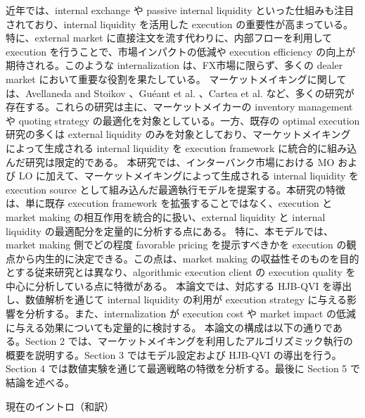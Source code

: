 近年では、internal exchange や passive internal liquidity といった仕組みも注目されており、internal liquidity を活用した execution の重要性が高まっている。特に、external market に直接注文を流す代わりに、内部フローを利用して execution を行うことで、市場インパクトの低減や execution efficiency の向上が期待される。このような internalization は、FX市場に限らず、多くの dealer market において重要な役割を果たしている。
マーケットメイキングに関しては、Avellaneda and Stoikov \cite{avellaneda2008high}、Guéant et al. \cite{gueant2013dealing}、Cartea et al. \cite{cartea2017algorithmic} など、多くの研究が存在する。これらの研究は主に、マーケットメイカーの inventory management や quoting strategy の最適化を対象としている。一方、既存の optimal execution 研究の多くは external liquidity のみを対象としており、マーケットメイキングによって生成される internal liquidity を execution framework に統合的に組み込んだ研究は限定的である。
本研究では、インターバンク市場における MO および LO に加えて、マーケットメイキングによって生成される internal liquidity を execution source として組み込んだ最適執行モデルを提案する。本研究の特徴は、単に既存 execution framework を拡張することではなく、execution と market making の相互作用を統合的に扱い、external liquidity と internal liquidity の最適配分を定量的に分析する点にある。
特に、本モデルでは、market making 側でどの程度 favorable pricing を提示すべきかを execution の観点から内生的に決定できる。この点は、market making の収益性そのものを目的とする従来研究とは異なり、algorithmic execution client の execution quality を中心に分析している点に特徴がある。
本論文では、対応する HJB-QVI を導出し、数値解析を通じて internal liquidity の利用が execution strategy に与える影響を分析する。また、internalization が execution cost や market impact の低減に与える効果についても定量的に検討する。
本論文の構成は以下の通りである。Section 2 では、マーケットメイキングを利用したアルゴリズミック執行の概要を説明する。Section 3 ではモデル設定および HJB-QVI の導出を行う。Section 4 では数値実験を通じて最適戦略の特徴を分析する。最後に Section 5 で結論を述べる。

現在のイントロ（和訳）

